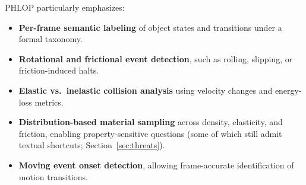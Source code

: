 \documentclass[conference]{IEEEtran}
\begin{document}






PHLOP particularly emphasizes:

\begin{itemize}
    \item \textbf{Per-frame semantic labeling} of object states and transitions under a formal taxonomy.
    \item \textbf{Rotational and frictional event detection}, such as rolling, slipping, or friction-induced halts.
    \item \textbf{Elastic vs.\ inelastic collision analysis} using velocity changes and energy-loss metrics.
    \item \textbf{Distribution-based material sampling} across density, elasticity, and friction, enabling property-sensitive questions (some of which still admit textual shortcuts; Section~\ref{sec:threats}).
    \item \textbf{Moving event onset detection}, allowing frame-accurate identification of motion transitions.
\end{itemize}
\end{document}
